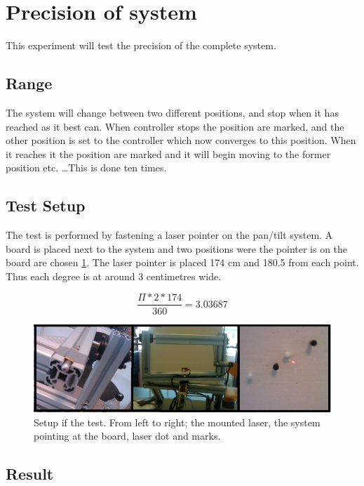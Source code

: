 \section{Precision of system}\label{sec:precisionofsystem}

This experiment will test the precision of the complete system. 

\subsection{Range}

The system will change between two different positions, and stop when it has reached as it best can. When controller stops the position are marked, and the other position is set to the controller which now converges to this position. When it reaches it the position are marked and it will begin moving to the former position etc. \dots This is done ten times.

\subsection{Test Setup}\label{subsec:testsetup}

The test is performed by fastening a laser pointer on the pan/tilt system. A board is placed next to the system and two positions were the pointer is on the board are chosen \ref{fig:systemtestsetup}. The laser pointer is placed 174 cm and 180.5 from each point. Thus each degree is at around 3 centimetres wide.

\[ \frac{\Pi*2*174}{360} = 3.03687 \]


\begin{figure}[htb]
	\centering
	\includegraphics[width=\textwidth,trim=0 0 0 0]{graphics/overallsystemtest.png} %
	\caption{Setup if the test. From left to right; the mounted laser, the system pointing at the board, laser dot and marks.}
	\label{fig:systemtestsetup}			%
\end{figure}


\subsection{Result}

